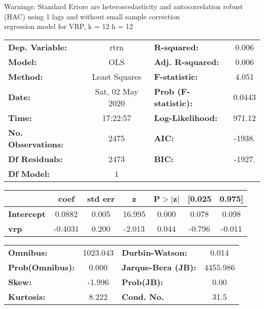 Warnings: \newline
 [1] Standard Errors are heteroscedasticity and autocorrelation robust (HAC) using 1 lags and without small sample correction\\ 

regression model for VRP, k = 12 h = 12\begin{center}
\begin{tabular}{lclc}
\toprule
\textbf{Dep. Variable:}    &       rtrn       & \textbf{  R-squared:         } &     0.006   \\
\textbf{Model:}            &       OLS        & \textbf{  Adj. R-squared:    } &     0.006   \\
\textbf{Method:}           &  Least Squares   & \textbf{  F-statistic:       } &     4.051   \\
\textbf{Date:}             & Sat, 02 May 2020 & \textbf{  Prob (F-statistic):} &   0.0443    \\
\textbf{Time:}             &     17:22:57     & \textbf{  Log-Likelihood:    } &    971.12   \\
\textbf{No. Observations:} &        2475      & \textbf{  AIC:               } &    -1938.   \\
\textbf{Df Residuals:}     &        2473      & \textbf{  BIC:               } &    -1927.   \\
\textbf{Df Model:}         &           1      & \textbf{                     } &             \\
\bottomrule
\end{tabular}
\begin{tabular}{lcccccc}
                   & \textbf{coef} & \textbf{std err} & \textbf{z} & \textbf{P$> |$z$|$} & \textbf{[0.025} & \textbf{0.975]}  \\
\midrule
\textbf{Intercept} &       0.0882  &        0.005     &    16.995  &         0.000        &        0.078    &        0.098     \\
\textbf{vrp}       &      -0.4031  &        0.200     &    -2.013  &         0.044        &       -0.796    &       -0.011     \\
\bottomrule
\end{tabular}
\begin{tabular}{lclc}
\textbf{Omnibus:}       & 1023.043 & \textbf{  Durbin-Watson:     } &    0.014  \\
\textbf{Prob(Omnibus):} &   0.000  & \textbf{  Jarque-Bera (JB):  } & 4455.986  \\
\textbf{Skew:}          &  -1.996  & \textbf{  Prob(JB):          } &     0.00  \\
\textbf{Kurtosis:}      &   8.222  & \textbf{  Cond. No.          } &     31.5  \\
\bottomrule
\end{tabular}
\end{center}

